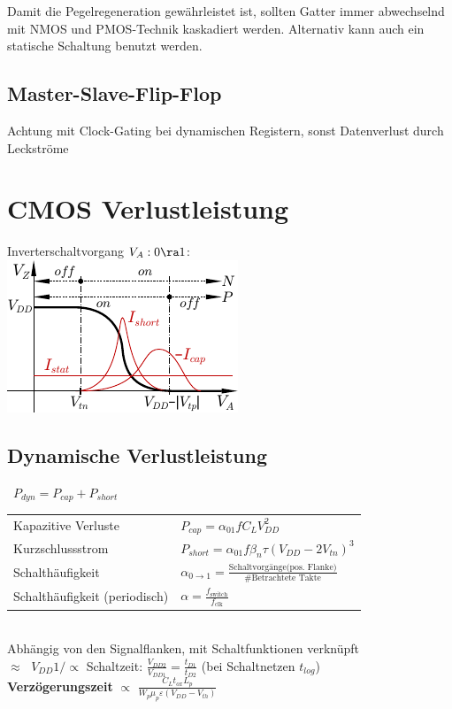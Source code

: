\documentclass[english]{latex4ei/latex4ei_sheet}
\begin{document}
Damit die Pegelregeneration gewährleistet ist, sollten Gatter immer abwechselnd mit NMOS und PMOS-Technik kaskadiert werden. Alternativ kann auch ein statische Schaltung benutzt werden.


\subsection{Master-Slave-Flip-Flop}


Achtung mit Clock-Gating bei dynamischen Registern, sonst Datenverlust durch Leckströme

\section{CMOS Verlustleistung}
Inverterschaltvorgang $V_A: 0 \ra 1$:\\
\includegraphics{img/ds/char_inverter.pdf}

\subsection{Dynamische Verlustleistung}
\qquad \ $P_{dyn} = P_{cap} + P_{short}$\\
\begin{tabular}{ll}
    \quad Kapazitive Verluste \qquad \ \quad \  & $P_{cap} = \alpha_{01} f C_L V_{DD}^2$                                                              \\
    \quad Kurzschlussstrom                      & $P_{short} = \alpha_{01} f \beta_n \tau (V_{DD} - 2V_{tn})^3$                                       \\[0.8em]
    \quad Schalthäufigkeit                      & $\alpha_{0 \rightarrow 1} = \frac{\text{Schaltvorgänge(pos. Flanke)}}{\text{\# Betrachtete Takte}}$ \\
    \quad Schalthäufigkeit (periodisch)         & $\alpha = \frac{f_\text{switch}}{f_\text{clk}}$                                                     \\
\end{tabular}\\
Abhängig von den Signalflanken, mit Schaltfunktionen verknüpft\\
$\approx \;$ $V_{DD} 1/\propto $ Schaltzeit: $\frac{V_{DD2}}{V_{DD1}} = \frac{t_{D1}}{t_{D2}}$ (bei Schaltnetzen $t_{log}$)\\
\textbf{Verzögerungszeit} $\propto$ $\frac{C_Lt_{ox}L_p}{W_p\mu_p\varepsilon(V_{DD} - V_{th})}$
\end{document}
